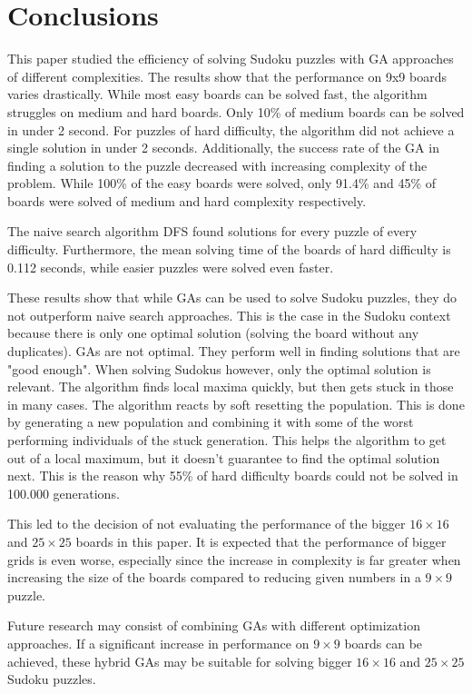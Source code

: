 \section{Conclusions}
\label{sec:conclusions}

This paper studied the efficiency of solving Sudoku puzzles with GA approaches of different complexities. The results show that the performance on 9x9 boards varies drastically. While most easy boards can be solved fast, the algorithm struggles on medium and hard boards. Only 10\% of medium boards can be solved in under 2 second. For puzzles of hard difficulty, the algorithm did not achieve a single solution in under 2 seconds. Additionally, the success rate of the GA in finding a solution to the puzzle decreased with increasing complexity of the problem. While 100\% of the easy boards were solved, only 91.4\% and 45\% of boards were solved of medium and hard complexity respectively. 

The naive search algorithm DFS found solutions for every puzzle of every difficulty. Furthermore, the mean solving time of the boards of hard difficulty is 0.112 seconds, while easier puzzles were solved even faster. 

These results show that while GAs can be used to solve Sudoku puzzles, they do not outperform naive search approaches. This is the case in the Sudoku context because there is only one optimal solution (solving the board without any duplicates). GAs are not optimal. They perform well in finding solutions that are "good enough". When solving Sudokus however, only the optimal solution is relevant. The algorithm finds local maxima quickly, but then gets stuck in those in many cases. The algorithm reacts by soft resetting the population. This is done by generating a new population and combining it with some of the worst performing individuals of the stuck generation. This helps the algorithm to get out of a local maximum, but it doesn't guarantee to find the optimal solution next. This is the reason why 55\% of hard difficulty boards could not be solved in 100.000 generations.

This led to the decision of not evaluating the performance of the bigger $16 \times 16$ and $25 \times 25$ boards in this paper. It is expected that the performance of bigger grids is even worse, especially since the increase in complexity is far greater when increasing the size of the boards compared to reducing given numbers in a $9 \times 9$ puzzle.

Future research may consist of combining GAs with different optimization approaches. If a significant increase in performance on $9 \times 9$ boards can be achieved, these hybrid GAs may be suitable for solving bigger $16 \times 16$ and $25 \times 25$ Sudoku puzzles.
